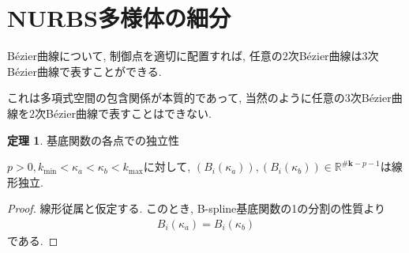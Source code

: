 \documentclass{jsarticle}
\newcommand\setR{\mathbb{R}}
\theoremstyle{definition}%
\newtheorem{thm}{定理}
\begin{document}
\newpage
\section{NURBS多様体の細分}
B\'{e}zier曲線について, 制御点を適切に配置すれば, 任意の$2$次B\'{e}zier曲線は$3$次B\'{e}zier曲線で表すことができる.

これは多項式空間の包含関係が本質的であって, 当然のように任意の$3$次B\'{e}zier曲線を$2$次B\'{e}zier曲線で表すことはできない.


\begin{screen}
	\begin{thm}
        \label{Thm601}
		基底関数の各点での独立性

        $p>0, k_{\min}<\kappa_a<\kappa_b<k_{\max}$に対して, $(B_i(\kappa_a)), (B_i(\kappa_b))\in \setR^{\#{\bm{k}}-p-1}$は線形独立.
	\end{thm}
\end{screen}
\begin{proof}
    線形従属と仮定する.
    このとき, B-spline基底関数の1の分割の性質より
    \begin{align}
        B_i(\kappa_a)
        =B_i(\kappa_b)
    \end{align}
    である.
\end{proof}
\end{document}
